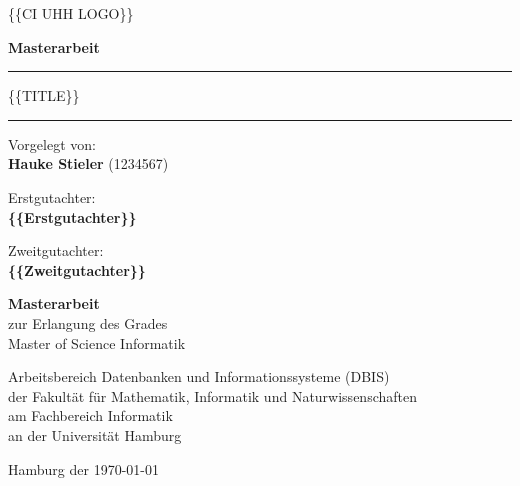\begin{titlepage}
	\{\{CI UHH LOGO\}\}
	\vspace{1cm}
	
	\begin{center}
		
		{
			\Large
			\textbf{Masterarbeit}
			\par
		}
		
		\vspace{2cm}
		\hrule
		\vspace{1cm}
		
		{\titlefont\huge\{\{TITLE\}\}\par}
		
		\vspace{1cm}
		\hrule
		\vspace{2cm}
	\end{center}
	
	\begin{multicols}{2}
		\raggedright
		Vorgelegt von:\\
		\textbf{Hauke Stieler} (1234567)\\
		
		\columnbreak
		\raggedleft
		
		Erstgutachter:\\
		\textbf{\{\{Erstgutachter\}\}}\par
		\vspace{0.25cm}
		Zweitgutachter:\\
		\textbf{\{\{Zweitgutachter\}\}}\\
	\end{multicols}
	
	\begin{center}
		\vfill
		
		\textbf{Masterarbeit}\\
		zur Erlangung des Grades\\
		Master of Science Informatik
		
		\vfill
		
		Arbeitsbereich Datenbanken und Informationssysteme (DBIS)\\
		der Fakultät für Mathematik, Informatik und Naturwissenschaften\\
		am Fachbereich Informatik\\
		an der Universität Hamburg
		
		
		\vspace{1cm}
		
		{
			Hamburg der \today
		}
	\end{center}
\end{titlepage}